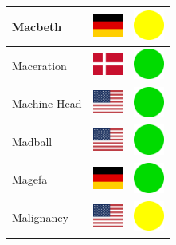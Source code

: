 \documentclass[12pt, a4paper, twoside]{report}
\begin{document}
\begin{center}
\begin{longtable}{|p{5cm}|p{2cm}|p{2cm}|}
Macbeth & \includegraphics[width=1cm]{4x3/de} & \includegraphics[width=1cm]{likes/m} \\ \hline
Maceration & \includegraphics[width=1cm]{4x3/dk} & \includegraphics[width=1cm]{likes/y} \\ \hline
Machine Head & \includegraphics[width=1cm]{4x3/us} & \includegraphics[width=1cm]{likes/y} \\ \hline
Madball & \includegraphics[width=1cm]{4x3/us} & \includegraphics[width=1cm]{likes/y} \\ \hline
Magefa & \includegraphics[width=1cm]{4x3/de} & \includegraphics[width=1cm]{likes/y} \\ \hline
Malignancy & \includegraphics[width=1cm]{4x3/us} & \includegraphics[width=1cm]{likes/m} \\ \hline

\end{longtable}
\end{center}
\end{document}
